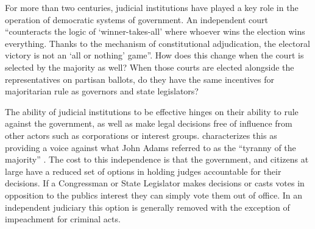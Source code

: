 \documentclass[Johnson MA Draft 2.tex]{subfiles}
\begin{document}
For more than two centuries, judicial institutions have played a key role in the operation of democratic systems of government.  An independent court ``counteracts the logic of `winner-takes-all' where whoever wins the election wins everything. Thanks to the mechanism of constitutional adjudication, the electoral victory is not an `all or nothing' game''\citep[1685]{Ferejohn2003}.  How does this change when the court is selected by the majority as well?  When those courts are elected alongside the representatives on partisan ballots, do they have the same incentives for majoritarian rule as governors and state legislators?

The ability of judicial institutions to be effective hinges on their ability to rule against the government, as well as make legal decisions free of influence from other actors such as corporations or interest groups.  \citet{Ferejohn2003} characterizes this as providing a voice against what John Adams referred to as the ``tyranny of the majority'' \citep{Adams1794}.  The cost to this independence is that the government, and citizens at large have a reduced set of options in holding judges accountable for their decisions.  If a Congressman or State Legislator makes decisions or casts votes in opposition to the publics interest they can simply vote them out of office.  In an independent judiciary this option is generally removed with the exception of impeachment for criminal acts.
\end{document}

